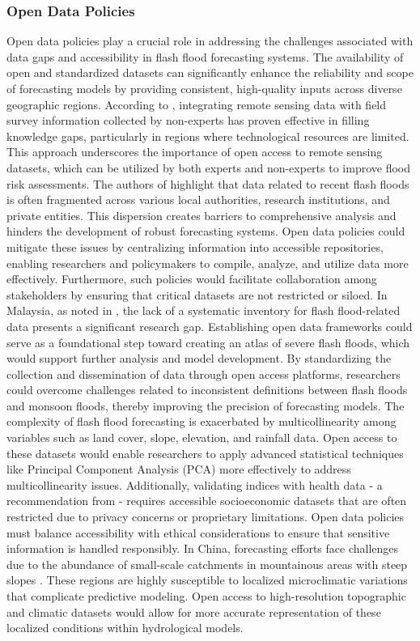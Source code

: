 \subsubsection{Open Data Policies}
Open data policies play a crucial role in addressing the challenges associated with data gaps and accessibility in flash flood forecasting systems. The availability of open and standardized datasets can significantly enhance the reliability and scope of forecasting models by providing consistent, high-quality inputs across diverse geographic regions. According to \citep{Dinis2021}, integrating remote sensing data with field survey information collected by non-experts has proven effective in filling knowledge gaps, particularly in regions where technological resources are limited. This approach underscores the importance of open access to remote sensing datasets, which can be utilized by both experts and non-experts to improve flood risk assessments. The authors of highlight that data related to recent flash floods is often fragmented across various local authorities, research institutions, and private entities. This dispersion creates barriers to comprehensive analysis and hinders the development of robust forecasting systems. Open data policies could mitigate these issues by centralizing information into accessible repositories, enabling researchers and policymakers to compile, analyze, and utilize data more effectively. Furthermore, such policies would facilitate collaboration among stakeholders by ensuring that critical datasets are not restricted or siloed. In Malaysia, as noted in \citep{Maqtan2022a}, the lack of a systematic inventory for flash flood-related data presents a significant research gap. Establishing open data frameworks could serve as a foundational step toward creating an atlas of severe flash floods, which would support further analysis and model development. By standardizing the collection and dissemination of data through open access platforms, researchers could overcome challenges related to inconsistent definitions between flash floods and monsoon floods, thereby improving the precision of forecasting models. The complexity of flash flood forecasting is exacerbated by multicollinearity among variables such as land cover, slope, elevation, and rainfall data. Open access to these datasets would enable researchers to apply advanced statistical techniques like Principal Component Analysis (PCA) more effectively to address multicollinearity issues. Additionally, validating indices with health data - a recommendation from \citep{AlRawas2024} - requires accessible socioeconomic datasets that are often restricted due to privacy concerns or proprietary limitations. Open data policies must balance accessibility with ethical considerations to ensure that sensitive information is handled responsibly. In China, forecasting efforts face challenges due to the abundance of small-scale catchments in mountainous areas with steep slopes \citep{Liu2018}. These regions are highly susceptible to localized microclimatic variations that complicate predictive modeling. Open access to high-resolution topographic and climatic datasets would allow for more accurate representation of these localized conditions within hydrological models. 